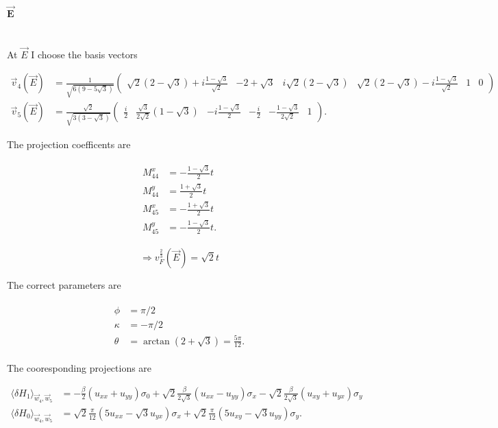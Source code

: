 \documentclass[../../../main.tex]{subfiles}
\begin{document}
\paragraph{$\mathbf{\vec{E}}$} \hfill \\

At $\vec{E}$ I choose the basis vectors 


\begin{align}
	\vec{v}_4(\vec{E}) &= \frac{1}{\sqrt{6(9-5\sqrt{3})}}
	\begin{pmatrix}
		\sqrt{2}(2-\sqrt{3}) + i\frac{1-\sqrt{3}}{\sqrt{2}} & -2+\sqrt{3} & i\sqrt{2}(2-\sqrt{3}) & \sqrt{2}(2-\sqrt{3}) -i\frac{1-\sqrt{3}}{\sqrt{2}} & 1 & 0
	\end{pmatrix} \\
	\vec{v}_5(\vec{E}) &= \frac{\sqrt{2}}{\sqrt{3(3-\sqrt{3})}}
	\begin{pmatrix}
		\frac{i}{2} & \frac{\sqrt{3}}{2\sqrt{2}}(1-\sqrt{3}) & -i\frac{1-\sqrt{3}}{2} & -\frac{i}{2} & -\frac{1-\sqrt{3}}{2\sqrt{2}} & 1
	\end{pmatrix}.
\end{align}

The projection coefficents are 

\begin{align}
	\begin{split}
		M_{44}^x &= -\frac{1-\sqrt{3}}{2}t \\
		M_{44}^y &= \frac{1+\sqrt{3}}{2}t \\
		M_{45}^x &= -\frac{1+\sqrt{3}}{2}t \\
		M_{45}^y &= -\frac{1-\sqrt{3}}{2}t.
	\end{split}
\end{align}

\begin{equation}
	\Rightarrow v_F^{\frac23}(\vec{E}) = \sqrt{2}t
\end{equation}

The correct parameters are 

\begin{align}
	\begin{split}
		\phi &= \pi/2\\	
		\kappa &= -\pi/2 \\
		\theta &= \arctan(2+\sqrt{3}) = \frac{5\pi}{12}.
	\end{split}
\end{align}

The cooresponding projections are 

\begin{align}
	\langle \delta H_1 \rangle_{\vec{w}_4, \vec{w}_5} &= - \frac{\beta}{2}(u_{xx}+u_{yy})\sigma_0 + \sqrt{2} \frac{\beta}{2\sqrt{3}}(u_{xx}-u_{yy})\sigma_x - \sqrt{2}\frac{\beta}{2\sqrt{3}}(u_{xy}+u_{yx}) \sigma_y \\
	\langle \delta H_0 \rangle_{\vec{w}_4, \vec{w}_5} &= \sqrt{2}\frac{\pi}{12}\left(5u_{xx} - \sqrt{3}u_{yx}\right)\sigma_x+ \sqrt{2} \frac{\pi}{12}(5u_{xy} - \sqrt{3}u_{yy}) \sigma_y.
\end{align}
\end{document}
